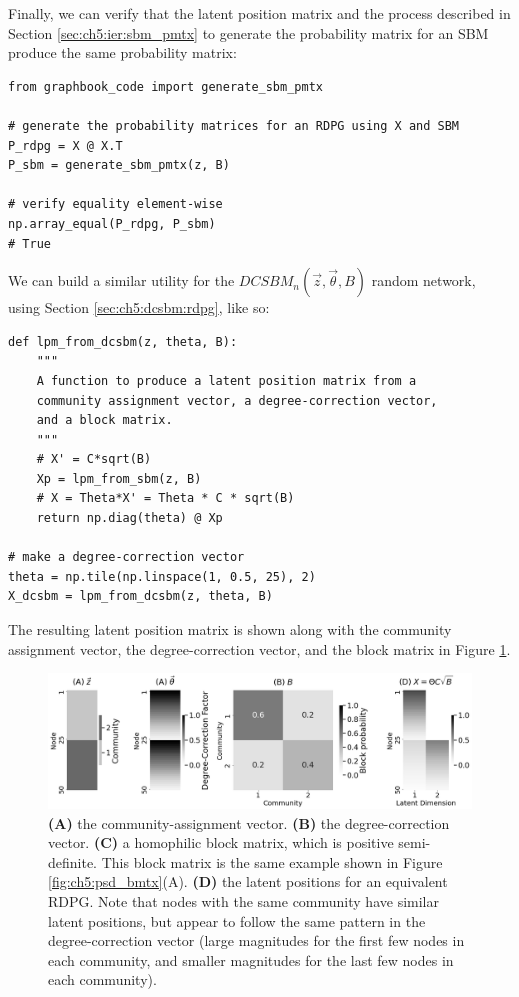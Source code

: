 Finally, we can verify that the latent position matrix and the process described in Section \ref{sec:ch5:ier:sbm_pmtx} to generate the probability matrix for an SBM produce the same probability matrix:

\begin{lstlisting}[style=python]
from graphbook_code import generate_sbm_pmtx

# generate the probability matrices for an RDPG using X and SBM
P_rdpg = X @ X.T
P_sbm = generate_sbm_pmtx(z, B)

# verify equality element-wise
np.array_equal(P_rdpg, P_sbm)
# True
\end{lstlisting}

We can build a similar utility for the $DCSBM_n(\vec z, \vec \theta, B)$ random network, using Section \ref{sec:ch5:dcsbm:rdpg}, like so:

\begin{lstlisting}
def lpm_from_dcsbm(z, theta, B):
    """
    A function to produce a latent position matrix from a
    community assignment vector, a degree-correction vector,
    and a block matrix.
    """
    # X' = C*sqrt(B)
    Xp = lpm_from_sbm(z, B)
    # X = Theta*X' = Theta * C * sqrt(B)
    return np.diag(theta) @ Xp

# make a degree-correction vector
theta = np.tile(np.linspace(1, 0.5, 25), 2)
X_dcsbm = lpm_from_dcsbm(z, theta, B)
\end{lstlisting}

The resulting latent position matrix is shown along with the community assignment vector, the degree-correction vector, and the block matrix in Figure \ref{fig:ch5:psd_block:dcsbm_lpm}.

\begin{figure}[h]
    \centering
    \includegraphics[width=\linewidth]{representations/ch5/Images/dcsbm_lpm.png}
    \caption[Latent position matrix for a positive semi-definite DCSBM]{\textbf{(A)} the community-assignment vector. \textbf{(B)} the degree-correction vector. \textbf{(C)} a homophilic block matrix, which is positive semi-definite. This block matrix is the same example shown in Figure \ref{fig:ch5:psd_bmtx}(A). \textbf{(D)} the latent positions for an equivalent RDPG. Note that nodes with the same community have similar latent positions, but appear to follow the same pattern in the degree-correction vector (large magnitudes for the first few nodes in each community, and smaller magnitudes for the last few nodes in each community).}
    \label{fig:ch5:psd_block:dcsbm_lpm}
\end{figure}


